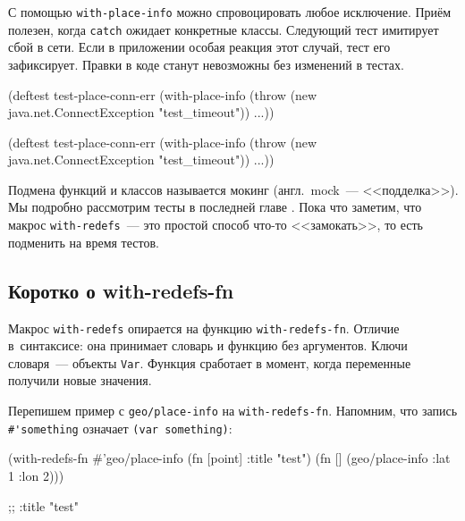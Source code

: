 \fi

С помощью \verb|with-place-info| можно спровоцировать любое исключение. Приём
полезен, когда \verb|catch| ожидает конкретные классы. Следующий тест имитирует
сбой в сети. Если в приложении особая реакция этот случай, тест его
зафиксирует. Правки в коде станут невозможны без изменений в тестах.


\ifnarrow

\begin{english}
  \begin{clojure}
(deftest test-place-conn-err
  (with-place-info
    (throw (new java.net.ConnectException
             "test_timeout"))
    ...))
  \end{clojure}
\end{english}

\else

\begin{english}
  \begin{clojure}
(deftest test-place-conn-err
  (with-place-info
    (throw (new java.net.ConnectException "test_timeout"))
    ...))
  \end{clojure}
\end{english}

\fi


Подмена функций и классов называется мокинг (англ.~mock~--- <<подделка>>). Мы
подробно рассмотрим тесты в последней главе . Пока что
заметим, что макрос \verb|with-redefs|~--- это простой способ что-то <<замокать>>,
то есть подменить на время тестов.

\subsection{Коротко о with-redefs-fn}


Макрос \verb|with-redefs| опирается на функцию \verb|with-redefs-fn|. Отличие
в~синтаксисе: она принимает словарь и функцию без аргументов. Ключи словаря~---
объекты \verb|Var|. Функция сработает в момент, когда переменные получили новые
значения.

Перепишем пример с \verb|geo/place-info| на \texttt{with\--re\-defs\--fn}. Напомним, что
запись \verb|#'|\texttt{some\-thing} означает \verb|(var something)|:

\ifnarrow

\begin{english}
  \begin{clojure}
(with-redefs-fn
  {#'geo/place-info (fn [point]
                      {:title "test"})}
  (fn []
    (geo/place-info {:lat 1 :lon 2})))

;; {:title "test"}
  \end{clojure}
\end{english}


